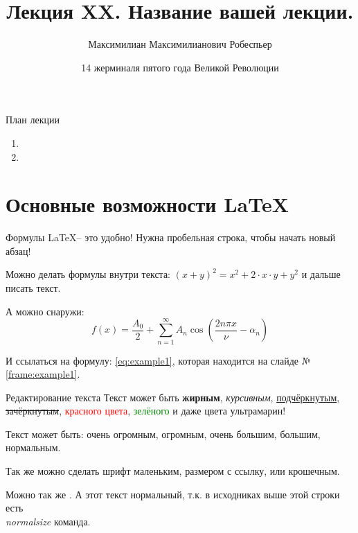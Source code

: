 \documentclass{beamer}
\title{Лекция XX. Название вашей лекции.}
\date{14 жерминаля пятого года Великой Революции}
\author{Максимилиан Максимилианович Робеспьер}
\institute{Москва, МГТУ им.Бауманка,\\ \href{https://t.me/iu8info}{\textbf{КИБ}}}
\newcommand{\рис}[1]{рис.\ref{#1}}
\newcommand{\Рис}[1]{Рис.\ref{#1}}
\newcommand{\таблицa}[1]{таблица~№\ref{#1}} %
\newcommand{\таблицы}[1]{таблицы~№\ref{#1}} %
\newcommand{\таблице}[1]{таблице~№\ref{#1}} %
\newcommand{\таблицу}[1]{таблицу~№\ref{#1}} %
\newcommand{\таблицей}[1]{таблицей~№\ref{#1}} %
\newcommand{\Таблицa}[1]{Таблица~№\ref{#1}} %
\newcommand{\Таблицы}[1]{Таблицы~№\ref{#1}} %
\newcommand{\Таблице}[1]{Таблице~№\ref{#1}} %
\newcommand{\Таблицу}[1]{Таблицу~№\ref{#1}} %
\newcommand{\Таблицей}[1]{Таблицей~№\ref{#1}} %
\begin{document}
  \maketitle
    
  \begin{frame}{План лекции}\label{frame:plan}
    \begin{enumerate}
	\item {}
	\item {}
	\end{enumerate}
 \end{frame}
    
    
\section{Основные возможности \LaTeX}\label{section:main_latex_opportunity}

\begin{frame}{Формулы}\label{frame:example1}
   \LaTeX -- это удобно!
   Нужна
   пробельная
   строка,
   чтобы
   начать новый абзац!
   
   Можно делать формулы внутри текста: $(x+y)^2=x^2 + 2 \cdot x \cdot y + y^2$ и дальше писать
   текст.
   
   А можно снаружи:
   \begin{equation}\label{eq:example1}
   	f(x) = \frac{A_0}{2} + \sum \limits_{n=1}^{\infty} A_n \cos \left( \frac{2 n \pi x}{\nu} - \alpha_n \right) 
   \end{equation}
   
   И ссылаться на формулу: \eqref{eq:example1}, 
   которая находится на слайде №\ref{frame:example1}.  
\end{frame}

\begin{frame}{Редактирование текста}
	Текст может быть 
	\textbf{жирным}, 
	\textit{курсивным},
	\underline{подчёркнутым},
	\sout{зачёркнутым},
	\textcolor{red}{красного цвета}, \textcolor{green}{зелёного} 	
	и даже \textcolor[RGB]{18,10,143}{цвета ультрамарин}! 
	
	Текст может быть:
	\Huge очень огромным,
	\huge огромным,
	\Large очень большим,
	\large большим,
	\normalsize нормальным.
	
	Так же можно сделать шрифт
	\small маленьким,
	\footnotesize размером с ссылку,
	\tiny или крошечным.
	
	Можно так же .
	\normalsize
	А этот текст нормальный, т.к. в исходниках выше этой строки есть \textit{\\normalsize} команда.
\end{frame}
\end{document}
